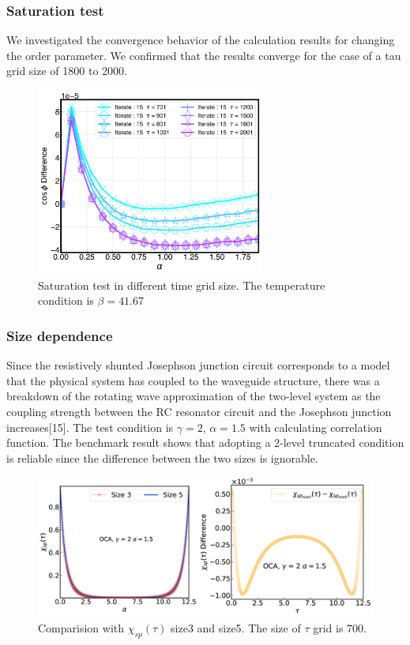 \documentclass{article}[12pt]
\begin{document}
\begin{spacing}{1.5}
\subsubsection*{Saturation test}
We investigated the convergence behavior of the calculation results for changing the order parameter. 
We confirmed that the results converge for the case of a tau grid size of 1800 to 2000. 
\begin{figure}[htbp]
  \centerline{\includegraphics[width=7.5cm]{TexFigure/4/4_2_01_saturation.png}}
  \caption{Saturation test in different time grid size. The temperature condition is $\beta = 41.67$}
\end{figure}
\subsubsection*{Size dependence}
Since the resistively shunted Josephson junction circuit corresponds to a model that the physical system has coupled to the waveguide structure,
there was a breakdown of the rotating wave approximation of the two-level system as the coupling strength between the RC resonator circuit 
and the Josephson junction increases[15]. The test condition is $\gamma =2$, $\alpha = 1.5$ with calculating correlation function. 
The benchmark result shows that adopting a 2-level truncated condition is reliable since the difference between the two sizes is ignorable.
\begin{figure}[H]
  \centerline{\includegraphics[width=15cm]{TexFigure/4/4_2_02_sizediff.png}}
  \caption{Comparision with $\chi_{sp}(\tau)$ size3 and size5. The size of $\tau$ grid is 700.}
\end{figure}
\pagebreak

\end{spacing}
\end{document}
